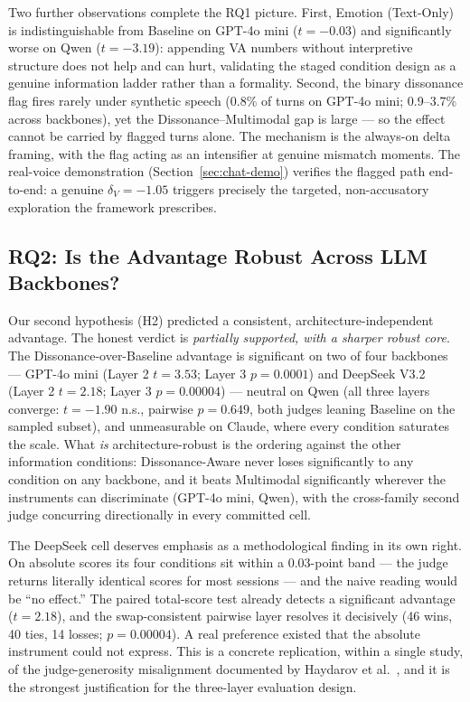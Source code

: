 Two further observations complete the RQ1 picture. First, Emotion (Text-Only) is indistinguishable from Baseline on GPT-4o mini ($t = -0.03$) and significantly worse on Qwen ($t = -3.19$): appending VA numbers without interpretive structure does not help and can hurt, validating the staged condition design as a genuine information ladder rather than a formality. Second, the binary dissonance flag fires rarely under synthetic speech (0.8\% of turns on GPT-4o mini; 0.9--3.7\% across backbones), yet the Dissonance--Multimodal gap is large --- so the effect cannot be carried by flagged turns alone. The mechanism is the always-on delta framing, with the flag acting as an intensifier at genuine mismatch moments. The real-voice demonstration (Section~\ref{sec:chat-demo}) verifies the flagged path end-to-end: a genuine $\delta_V = -1.05$ triggers precisely the targeted, non-accusatory exploration the framework prescribes.

\subsection{RQ2: Is the Advantage Robust Across LLM Backbones?}

Our second hypothesis (H2) predicted a consistent, architecture-independent advantage. The honest verdict is \emph{partially supported, with a sharper robust core}. The Dissonance-over-Baseline advantage is significant on two of four backbones --- GPT-4o mini (Layer 2 $t = 3.53$; Layer 3 $p = 0.0001$) and DeepSeek V3.2 (Layer 2 $t = 2.18$; Layer 3 $p = 0.00004$) --- neutral on Qwen (all three layers converge: $t = -1.90$ n.s., pairwise $p = 0.649$, both judges leaning Baseline on the sampled subset), and unmeasurable on Claude, where every condition saturates the scale. What \emph{is} architecture-robust is the ordering against the other information conditions: Dissonance-Aware never loses significantly to any condition on any backbone, and it beats Multimodal significantly wherever the instruments can discriminate (GPT-4o mini, Qwen), with the cross-family second judge concurring directionally in every committed cell.

The DeepSeek cell deserves emphasis as a methodological finding in its own right. On absolute scores its four conditions sit within a 0.03-point band --- the judge returns literally identical scores for most sessions --- and the naive reading would be ``no effect.'' The paired total-score test already detects a significant advantage ($t = 2.18$), and the swap-consistent pairwise layer resolves it decisively (46 wins, 40 ties, 14 losses; $p = 0.00004$). A real preference existed that the absolute instrument could not express. This is a concrete replication, within a single study, of the judge-generosity misalignment documented by Haydarov et al.\ \cite{haydarov-etal-2025-towards}, and it is the strongest justification for the three-layer evaluation design.

